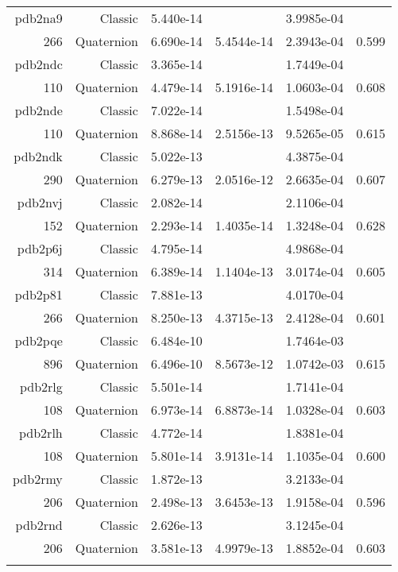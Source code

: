 \begin{xltabular}{\textwidth}{r|rS[table-format=1.3e+2]S[table-format=1.4e+2]S[table-format=1.4e+2]S[table-format=-1.3]}
pdb2na9 & Classic & 5.440e-14 &  & 3.9985e-04 & \\
266 & Quaternion & 6.690e-14 & 5.4544e-14 & 2.3943e-04 & 0.599\\  \addlinespace
pdb2ndc & Classic & 3.365e-14 &  & 1.7449e-04 & \\
110 & Quaternion & 4.479e-14 & 5.1916e-14 & 1.0603e-04 & 0.608\\  \addlinespace
pdb2nde & Classic & 7.022e-14 &  & 1.5498e-04 & \\
110 & Quaternion & 8.868e-14 & 2.5156e-13 & 9.5265e-05 & 0.615\\  \addlinespace
pdb2ndk & Classic & 5.022e-13 &  & 4.3875e-04 & \\
290 & Quaternion & 6.279e-13 & 2.0516e-12 & 2.6635e-04 & 0.607\\  \addlinespace
pdb2nvj & Classic & 2.082e-14 &  & 2.1106e-04 & \\
152 & Quaternion & 2.293e-14 & 1.4035e-14 & 1.3248e-04 & 0.628\\  \addlinespace
pdb2p6j & Classic & 4.795e-14 &  & 4.9868e-04 & \\
314 & Quaternion & 6.389e-14 & 1.1404e-13 & 3.0174e-04 & 0.605\\  \addlinespace
pdb2p81 & Classic & 7.881e-13 &  & 4.0170e-04 & \\
266 & Quaternion & 8.250e-13 & 4.3715e-13 & 2.4128e-04 & 0.601\\  \addlinespace
pdb2pqe & Classic & 6.484e-10 &  & 1.7464e-03 & \\
896 & Quaternion & 6.496e-10 & 8.5673e-12 & 1.0742e-03 & 0.615\\  \addlinespace
pdb2rlg & Classic & 5.501e-14 &  & 1.7141e-04 & \\
108 & Quaternion & 6.973e-14 & 6.8873e-14 & 1.0328e-04 & 0.603\\  \addlinespace
pdb2rlh & Classic & 4.772e-14 &  & 1.8381e-04 & \\
108 & Quaternion & 5.801e-14 & 3.9131e-14 & 1.1035e-04 & 0.600\\  \addlinespace
pdb2rmy & Classic & 1.872e-13 &  & 3.2133e-04 & \\
206 & Quaternion & 2.498e-13 & 3.6453e-13 & 1.9158e-04 & 0.596\\  \addlinespace
pdb2rnd & Classic & 2.626e-13 &  & 3.1245e-04 & \\
206 & Quaternion & 3.581e-13 & 4.9979e-13 & 1.8852e-04 & 0.603\\  \addlinespace

\end{xltabular}
